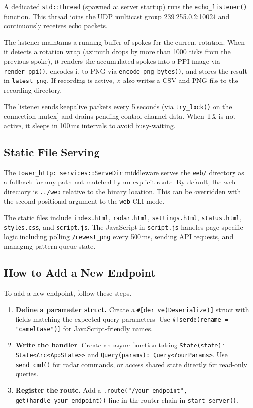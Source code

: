 \documentclass[11pt,letterpaper]{article}
\begin{document}
A dedicated \texttt{std::thread} (spawned at server startup) runs the \texttt{echo\_listener()} function. This thread joins the UDP multicast group 239.255.0.2:10024 and continuously receives echo packets.

The listener maintains a running buffer of spokes for the current rotation. When it detects a rotation wrap (azimuth drops by more than 1000 ticks from the previous spoke), it renders the accumulated spokes into a PPI image via \texttt{render\_ppi()}, encodes it to PNG via \texttt{encode\_png\_bytes()}, and stores the result in \texttt{latest\_png}. If recording is active, it also writes a CSV and PNG file to the recording directory.

The listener sends keepalive packets every 5 seconds (via \texttt{try\_lock()} on the connection mutex) and drains pending control channel data. When TX is not active, it sleeps in 100\,ms intervals to avoid busy-waiting.

\subsection{Static File Serving}
\label{subsec:static-files}

The \texttt{tower\_http::services::ServeDir} middleware serves the \texttt{web/} directory as a fallback for any path not matched by an explicit route. By default, the web directory is \texttt{../web} relative to the binary location. This can be overridden with the second positional argument to the \texttt{web} CLI mode.

The static files include \texttt{index.html}, \texttt{radar.html}, \texttt{settings.html}, \texttt{status.html}, \texttt{styles.css}, and \texttt{script.js}. The JavaScript in \texttt{script.js} handles page-specific logic including polling \texttt{/newest\_png} every 500\,ms, sending API requests, and managing pattern queue state.

\subsection{How to Add a New Endpoint}
\label{subsec:add-endpoint}

To add a new endpoint, follow these steps.

\begin{enumerate}[leftmargin=2em]
\item \textbf{Define a parameter struct.} Create a \texttt{\#[derive(Deserialize)]} struct with fields matching the expected query parameters. Use \texttt{\#[serde(rename = "camelCase")]} for JavaScript-friendly names.

\item \textbf{Write the handler.} Create an async function taking \texttt{State(state): State<Arc<AppState>{}>} and \texttt{Query(params): Query<YourParams>}. Use \texttt{send\_cmd()} for radar commands, or access shared state directly for read-only queries.

\item \textbf{Register the route.} Add a \texttt{.route("/your\_endpoint", get(handle\_your\_endpoint))} line in the router chain in \texttt{start\_server()}.
\end{enumerate}
\end{document}
